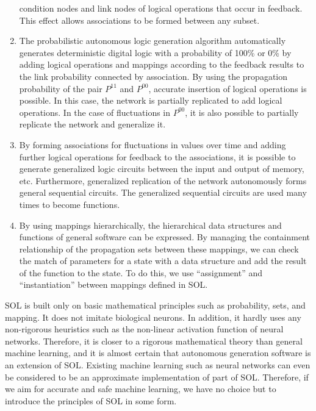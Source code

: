 \documentclass[12pt]{article}
\begin{document}
\begin{enumerate}
  condition nodes and link nodes of logical operations that occur in
  feedback. This effect allows associations to be formed between any
  subset.
\item
  The probabilistic autonomous logic generation algorithm automatically
  generates deterministic digital logic with a probability of 100\% or
  0\% by adding logical operations and mappings according to the
  feedback results to the link probability connected by association. By
  using the propagation probability of the pair \(P^{11}\) and
  \(P^{00}\), accurate insertion of logical operations is possible. In
  this case, the network is partially replicated to add logical
  operations. In the case of fluctuations in \(P^{00}\), it is also
  possible to partially replicate the network and generalize it.
\item
  By forming associations for fluctuations in values
  \hspace{0pt}\hspace{0pt}over time and adding further logical
  operations for feedback to the associations, it is possible to
  generate generalized logic circuits between the input and output of
  memory, etc. Furthermore, generalized replication of the network
  autonomously forms general sequential circuits. The generalized
  sequential circuits are used many times to become functions.
\item
  By using mappings hierarchically, the hierarchical data structures and
  functions of general software can be expressed. By managing the
  containment relationship of the propagation sets between these
  mappings, we can check the match of parameters for a state with a data
  structure and add the result of the function to the state. To do this,
  we use ``assignment'' and ``instantiation'' between mappings defined
  in SOL.
\end{enumerate}

SOL is built only on basic mathematical principles such as probability,
sets, and mapping. It does not imitate biological neurons. In addition,
it hardly uses any non-rigorous heuristics such as the non-linear
activation function of neural networks. Therefore, it is closer to a
rigorous mathematical theory than general machine learning, and it is
almost certain that autonomous generation software is an extension of
SOL. Existing machine learning such as neural networks can even be
considered to be an approximate implementation of part of SOL.
Therefore, if we aim for accurate and safe machine learning, we have no
choice but to introduce the principles of SOL in some form.
\end{document}
